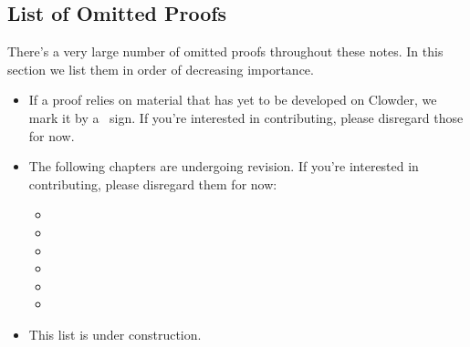 \subsection{List of Omitted Proofs}\label{subsection-list-of-omitted-proofs}

There's a very large number of omitted proofs throughout these notes. In this section we list them in order of decreasing importance.
\begin{itemize}
    \item If a proof relies on material that has yet to be developed on Clowder, we mark it by a \warningsign\ sign. If you're interested in contributing, please disregard those for now.
    \item The following chapters are undergoing revision. If you're interested in contributing, please disregard them for now:
        \begin{itemize}
            \item \ChapterRelations
            \item \ChapterConstructionsWithRelations
            \item \ChapterConditionsOnRelations
            \item \ChapterCategories
            \item \ChapterConstructionsWithMonoidalCategories
            \item \ChapterTypesOfMorphismsInBicategories
        \end{itemize}
    \item This list is under construction.
\end{itemize}
